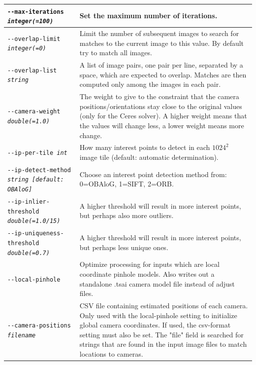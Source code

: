 \begin{longtable}{|l|p{7.5cm}|}
\texttt{-\/-max-iterations \textit{integer(=100)}} & Set the maximum
number of iterations. \\ \hline

\texttt{-\/-overlap-limit \textit{integer(=0)}} & Limit the number of
subsequent images to search for matches to the current image to this
value.  By default try to match all images.\\ \hline

\texttt{-\/-overlap-list \textit{string}} & A list of image pairs, one pair per line, separated by a space, which are expected to overlap. Matches are then computed only among the images in each pair.
\\ \hline

\texttt{-\/-camera-weight \textit{double(=1.0)}} &
The weight to give to the constraint that the camera positions/orientations stay close to
the original values (only for the Ceres solver).  A higher weight means that the values will
change less, a lower weight means more change.
\\ \hline

\texttt{-\/-ip-per-tile \textit{int}} &
How many interest points to detect in each $1024^2$ image tile (default: automatic
determination).
\\ \hline

\texttt{-\/-ip-detect-method \textit{string [default: OBAloG]}} & Choose an interest point
detection method from: 0=OBAloG, 1=SIFT, 2=ORB. \\ \hline

\texttt{-\/-ip-inlier-threshold \textit{double(=1.0/15)}} & 
A higher threshold will result in more interest points, but perhaps also more outliers.
\\ \hline

\texttt{-\/-ip-uniqueness-threshold \textit{double(=0.7)}} & 
A higher threshold will result in more interest points, but perhaps less unique ones.
\\ \hline

\texttt{-\/-local-pinhole} & Optimize processing for inputs which are local coordinate 
pinhole models.
Also writes out a standalone .tsai camera model file instead of adjust files. 
\\ \hline

\texttt{-\/-camera-positions \textit{filename}} & CSV file containing estimated positions of each camera.
Only used with the local-pinhole setting to initialize global camera coordinates. If used,
the csv-format setting must also be set.  The "file" field is searched for strings that are found
in the input image files to match locations to cameras.\\ \hline



\end{longtable}
